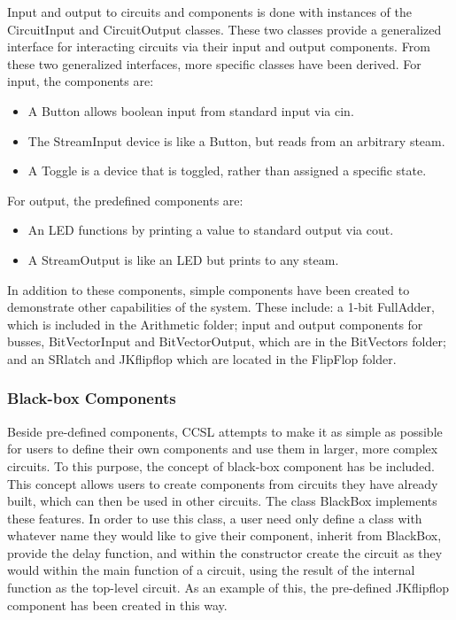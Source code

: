 \documentclass{article}
\begin{document}
Input and output to circuits and components is done with instances of the CircuitInput and CircuitOutput classes. These two classes provide a generalized interface for interacting circuits via their input and output components. From these two generalized interfaces, more specific classes have been derived. For input, the components are:

\begin{itemize}

\item A Button allows boolean input from standard input via cin.

\item The StreamInput device is like a Button, but reads from an arbitrary steam.

\item A Toggle is a device that is toggled, rather than assigned a specific state.

\end{itemize}

For output, the predefined components are:

\begin{itemize}

\item An LED functions by printing a value to standard output via cout.

\item A StreamOutput is like an LED but prints to any steam.

\end{itemize}

In addition to these components, simple components have been created to demonstrate other capabilities of the system. These include: a 1-bit FullAdder, which is included in the Arithmetic folder; input and output components for busses, BitVectorInput and BitVectorOutput, which are in the BitVectors folder; and an SRlatch and JKflipflop which are located in the FlipFlop folder.

\subsubsection{Black-box Components}

Beside pre-defined components, CCSL attempts to make it as simple as possible for users to define their own components and use them in larger, more complex circuits. To this purpose, the concept of black-box component has be included. This concept allows users to create components from circuits they have already built, which can then be used in other circuits. The class BlackBox implements these features. In order to use this class, a user need only define a class with whatever name they would like to give their component, inherit from BlackBox, provide the delay function, and within the constructor create the circuit as they would within the main function of a circuit, using the result of the internal function as the top-level circuit. As an example of this, the pre-defined JKflipflop component has been created in this way.
\end{document}
